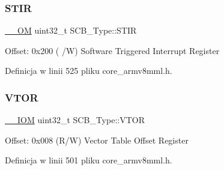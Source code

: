 \subsubsection{\texorpdfstring{S\+T\+IR}{STIR}}
{\footnotesize\ttfamily \hyperlink{core__sc300_8h_a0ea2009ed8fd9ef35b48708280fdb758}{\+\_\+\+\_\+\+OM} uint32\+\_\+t S\+C\+B\+\_\+\+Type\+::\+S\+T\+IR}

Offset\+: 0x200 ( /W) Software Triggered Interrupt Register 

Definicja w linii 525 pliku core\+\_\+armv8mml.\+h.

\mbox{\label{struct_s_c_b___type_a187a4578e920544ed967f98020fb8170}} 
\subsubsection{\texorpdfstring{V\+T\+OR}{VTOR}}
{\footnotesize\ttfamily \hyperlink{core__sc300_8h_ab6caba5853a60a17e8e04499b52bf691}{\+\_\+\+\_\+\+I\+OM} uint32\+\_\+t S\+C\+B\+\_\+\+Type\+::\+V\+T\+OR}

Offset\+: 0x008 (R/W) Vector Table Offset Register 

Definicja w linii 501 pliku core\+\_\+armv8mml.\+h.




